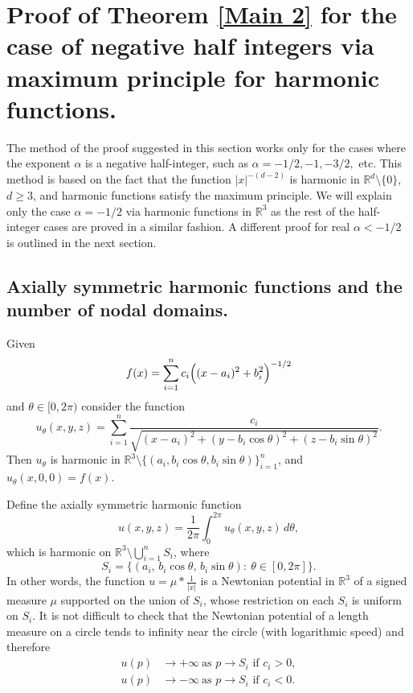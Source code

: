 \documentclass{article}
\newcommand{\R}{\mathbb{R}}
\begin{document}
\section{Proof of Theorem \ref{Main 2} for the case of negative half integers via maximum principle for harmonic functions.} \label{Sec: half integeres}
The method of the proof suggested in this section works only for the cases where the exponent $\alpha$ is a negative half-integer, such as $\alpha = -1/2, -1, -3/2,$ etc. 
This method is based on the fact that the function $|x|^{-(d-2)}$ is harmonic in $\R^d \setminus \{0\}$, $d\geq 3$,
and harmonic functions satisfy the maximum principle.
We will explain only the case $\alpha = -1/2$ via harmonic functions in $\mathbb{R}^3$ as the rest of the half-integer cases are proved in a similar fashion. A different proof for real $\alpha<-1/2$ is outlined in the next section.
\subsection{Axially symmetric harmonic functions and the number of nodal domains.}





\medskip

Given
\[
  f(x)=\sum_{i=1}^n c_i\Bigl((x-a_i)^2+b_i^2\Bigr)^{-1/2}
\]
and $\theta \in [0,2\pi)$ consider the function
\[
  u_\theta(x,y,z)=\sum_{i=1}^n \frac{c_i}{\sqrt{(x-a_i)^2+(y-b_i\cos \theta)^2+(z-b_i\sin \theta)^2}}.
\]
Then $u_\theta$ is harmonic in $\R^3\setminus\{(a_i,b_i\cos \theta,b_i\sin \theta)\}_{i=1}^n$, and
$u_\theta(x,0,0)=f(x)$.


Define the axially symmetric harmonic function
\[
  u(x,y,z)=\frac{1}{2\pi}\int_{0}^{2\pi} u_\theta(x,y,z)\,d\theta,
\]
which is harmonic on $\R^3\setminus\bigcup_{i=1}^n S_i$, where
\[
  S_i=\{(a_i,\,b_i\cos\theta,\,b_i\sin\theta):\ \theta\in[0,2\pi]\}.
\]
In other words, the function $u=\mu * \frac{1}{|x|}$ is a Newtonian potential in $\mathbb{R}^3$ of a signed measure $\mu$ supported on the union of $S_i$,
whose restriction on each $S_i$ is uniform on $S_i$. It is not difficult to check that the Newtonian potential of a length measure on a circle tends to infinity near the circle (with logarithmic speed) and therefore
\begin{align*}
  u(p)&\longrightarrow +\infty \ \text{as } p\to S_i \text{ if } c_i>0,\\
  u(p)&\longrightarrow -\infty \ \text{as } p\to S_i \text{ if } c_i<0.
\end{align*}
\end{document}
